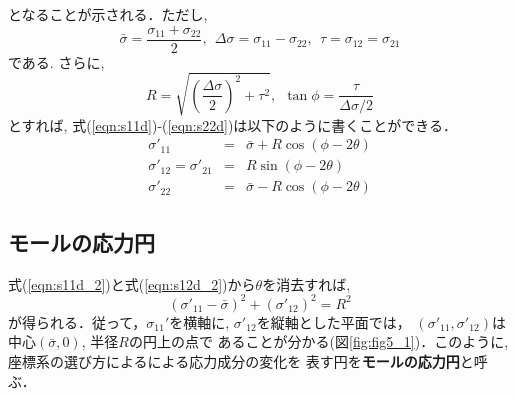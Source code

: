 \documentclass[10pt,a4j]{jbook}
\begin{document}
となることが示される．ただし, 
\begin{equation}
	\bar \sigma = \frac{\sigma_{11}+\sigma_{22}}{2}, \ \ 
	\Delta \sigma = \sigma_{11} -\sigma_{22}, \ \ 
	\tau = \sigma_{12}=\sigma_{21}
	\label{eqn:def_sig_bar}
\end{equation}
である. さらに,
\begin{equation}
	R=\sqrt{\left(\frac{\Delta \sigma}{2}\right)^2 + \tau ^2 }, \ \ 
	\tan \phi = \frac{\tau}{\Delta\sigma /2}
	\label{eqn:def_R}
\end{equation}
とすれば, 式(\ref{eqn:s11d})-(\ref{eqn:s22d})は以下のように書くことができる．
\begin{eqnarray}
	\sigma'_{11} &=& \bar{\sigma}+R \cos \left( \phi -2\theta \right) 
		\label{eqn:s11d_2} \\
	\sigma'_{12}=\sigma'_{21} &=&  R \sin \left( \phi -2 \theta \right)
		\label{eqn:s12d_2} \\
	\sigma'_{22} &=& \bar{\sigma} - R \cos \left( \phi-2\theta \right) 
		\label{eqn:s22d_2}
\end{eqnarray}
\subsection{モールの応力円}
式(\ref{eqn:s11d_2})と式(\ref{eqn:s12d_2})から$\theta$を消去すれば, 
\begin{equation}
	\left( \sigma'_{11} -\bar{\sigma}\right)^2 + \left(\sigma'_{12}\right)^2 = R^2
\end{equation}
が得られる．従って，$\sigma_{11}'$を横軸に, $\sigma'_{12}$を縦軸とした平面では，
$(\sigma'_{11}, \sigma'_{12})$は中心$(\bar{\sigma}, 0)$, 半径$R$の円上の点で
あることが分かる(図\ref{fig:fig5_1})．このように, 座標系の選び方によるによる応力成分の変化を
表す円を{\bf モールの応力円}と呼ぶ．
\end{document}
